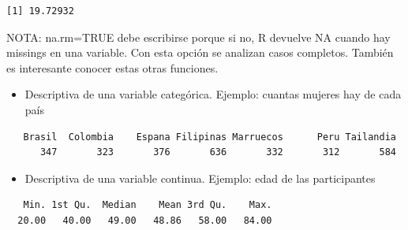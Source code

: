 \documentclass[
]{book}
\newenvironment{Shaded}{\begin{snugshade}}{\end{snugshade}}
\newcommand{\AttributeTok}[1]{\textcolor[rgb]{0.77,0.63,0.00}{#1}}
\newcommand{\ConstantTok}[1]{\textcolor[rgb]{0.00,0.00,0.00}{#1}}
\newcommand{\FunctionTok}[1]{\textcolor[rgb]{0.00,0.00,0.00}{#1}}
\newcommand{\NormalTok}[1]{#1}
\newcommand{\SpecialCharTok}[1]{\textcolor[rgb]{0.00,0.00,0.00}{#1}}
\providecommand{\tightlist}{%
  \setlength{\itemsep}{0pt}\setlength{\parskip}{0pt}}
\begin{document}
\begin{Shaded}
\end{Shaded}

\begin{verbatim}
[1] 19.72932
\end{verbatim}

NOTA: na.rm=TRUE debe escribirse porque si no, R devuelve NA cuando hay missings en una variable. Con esta opción se analizan casos completos. También es interesante conocer estas otras funciones.

\begin{itemize}
\tightlist
\item
  Descriptiva de una variable categórica. Ejemplo: cuantas mujeres hay de cada país
\end{itemize}

\begin{Shaded}
\end{Shaded}

\begin{verbatim}
   Brasil  Colombia    Espana Filipinas Marruecos      Peru Tailandia 
      347       323       376       636       332       312       584 
\end{verbatim}

\begin{itemize}
\tightlist
\item
  Descriptiva de una variable continua. Ejemplo: edad de las participantes
\end{itemize}

\begin{Shaded}
\end{Shaded}

\begin{verbatim}
   Min. 1st Qu.  Median    Mean 3rd Qu.    Max. 
  20.00   40.00   49.00   48.86   58.00   84.00 
\end{verbatim}
\end{document}
